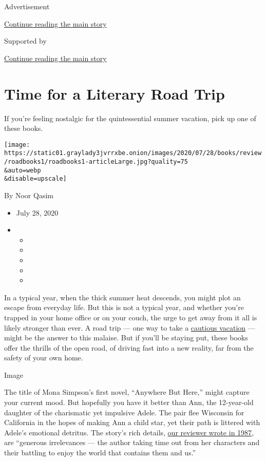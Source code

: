 Advertisement

\protect\hyperlink{after-top}{Continue reading the main story}

Supported by

\protect\hyperlink{after-sponsor}{Continue reading the main story}

\hypertarget{time-for-a-literary-road-trip}{%
\section{Time for a Literary Road
Trip}\label{time-for-a-literary-road-trip}}

If you're feeling nostalgic for the quintessential summer vacation, pick
up one of these books.

\texttt{[image: https://static01.graylady3jvrrxbe.onion/images/2020/07/28/books/review/roadbooks1/roadbooks1-articleLarge.jpg?quality=75\\\&auto=webp\\\&disable=upscale]}

By Noor Qasim

\begin{itemize}
\item
  July 28, 2020
\item
  \begin{itemize}
  \item
  \item
  \item
  \item
  \item
  \end{itemize}
\end{itemize}

In a typical year, when the thick summer heat descends, you might plot
an escape from everyday life. But this is not a typical year, and
whether you're trapped in your home office or on your couch, the urge to
get away from it all is likely stronger than ever. A road trip --- one
way to take a
\href{https://www.nytimes3xbfgragh.onion/2020/07/16/travel/virus-vacation.html?searchResultPosition=4}{cautious
vacation} --- might be the answer to this malaise. But if you'll be
staying put, these books offer the thrills of the open road, of driving
fast into a new reality, far from the safety of your own home.

Image

The title of Mona Simpson's first novel, ``Anywhere But Here,'' might
capture your current mood. But hopefully you have it better than Ann,
the 12-year-old daughter of the charismatic yet impulsive Adele. The
pair flee Wisconsin for California in the hopes of making Ann a child
star, yet their path is littered with Adele's emotional detritus. The
story's rich details,
\href{https://www.nytimes3xbfgragh.onion/1987/01/11/books/in-thrall-to-a-lethal-mother.html}{our
reviewer wrote in 1987}, are ``generous irrelevances --- the author
taking time out from her characters and their battling to enjoy the
world that contains them and us.''

